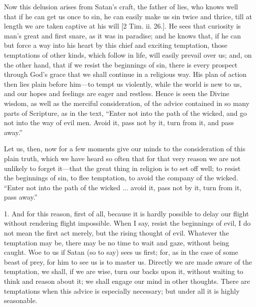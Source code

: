 Now this delusion arises from Satan's craft, the father of lies,
who knows well that if he can get us once to sin, he can easily make
us sin twice and thrice, till at length we are taken captive at his
will [2 Tim. ii. 26.]. He sees that curiosity is man's great and first
snare, as it was in paradise; and he knows that, if he can but force a
way into his heart by this chief and exciting temptation, those
temptations of other kinds, which follow in life, will easily prevail
over us; and, on the other hand, that if we resist the beginnings of
sin, there is every prospect through God's grace that we shall
continue in a religious way. His plan of action then lies plain before
him—to tempt us violently, while the world is new to us, and our
hopes and feelings are eager and restless. Hence is seen the Divine
wisdom, as well as the merciful consideration, of the advice contained
in so many parts of Scripture, as in the text, ``Enter not into
the path of the wicked, and go not into the way of evil men. Avoid it,
pass not by it, turn from it, and pass away.''

Let us, then, now for a few moments give our minds to the
consideration of this plain truth, which we have heard so often that
for that very reason we are not unlikely to forget it—that the great
thing in religion is to set off well; to resist the beginnings of sin,
to flee temptation, to avoid the company of the wicked. ``Enter
not into the path of the wicked ... avoid it, pass not by it, turn
from it, pass away.''

1. And for this reason, first of all, because it is hardly possible
to delay our flight without rendering flight impossible. When I say,
resist the beginnings of evil, I do not mean the first act merely, but
the rising thought of evil. Whatever the temptation may be, there may
be no time to wait and gaze, without being caught. Woe to us if Satan
(so to say) sees us first; for, as in the case of some beast of prey,
for him to see us is to master us. Directly we are made aware of the
temptation, we shall, if we are wise, turn our backs upon it, without
waiting to think and reason about it; we shall engage our mind in
other thoughts. There are temptations when this advice is especially
necessary; but under all it is highly seasonable.

